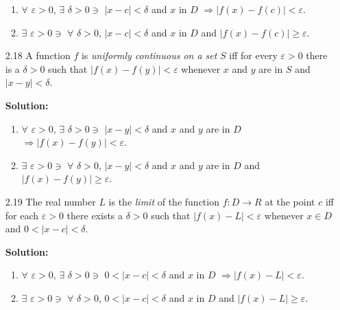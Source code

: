 \begin{enumerate}
      \begin{enumerate}
         \item $\forall$ $\varepsilon > 0$, $\exists$ $\delta > 0 \ni$
               $|x - c| < \delta$ and $x$ in $D$
               $\Rightarrow |f(x) -f(c)| < \varepsilon$.
         \item $\exists$ $\varepsilon > 0 \ni$ $\forall$ $\delta > 0$,
               $|x - c| < \delta$ and $x$ in $D$ and
               $|f(x) - f(c)| \ge \varepsilon$.
      \end{enumerate}
   \item[2.18] A function $f$ is \textit{uniformly continuous on a set} $S$ iff
               for every $\varepsilon > 0$ there is a $\delta > 0$ such that
               $|f(x) - f(y)| < \varepsilon$ whenever $x$ and $y$ are in $S$ and
               $|x - y| < \delta$.

      \textbf{Solution:}
      
      \begin{enumerate}
         \item $\forall$ $\varepsilon > 0$, $\exists$ $\delta > 0 \ni$
               $|x - y| < \delta$ and $x$ and $y$ are in $D$
               $\Rightarrow |f(x) - f(y)| < \varepsilon$.
         \item $\exists$ $\varepsilon > 0 \ni$ $\forall$ $\delta > 0$,
               $|x - y| < \delta$ and $x$ and $y$ are in $D$ and
               $|f(x) - f(y)| \ge \varepsilon$.
      \end{enumerate}
   \item[2.19] The real number $L$ is the \textit{limit} of the function
               $f : D \rightarrow R$ at the point $c$ iff for each
               $\varepsilon > 0$ there exists a $\delta > 0$ such that
               $|f(x) - L| < \varepsilon$ whenever $x \in D$ and
               $0 < |x - c| < \delta$.

      \textbf{Solution:}
      
      \begin{enumerate}
         \item $\forall$ $\varepsilon > 0$, $\exists$ $\delta > 0 \ni$
               $0 < |x - c| < \delta$ and $x$ in $D$
               $\Rightarrow |f(x) - L| < \varepsilon$.
         \item $\exists$ $\varepsilon > 0 \ni$ $\forall$ $\delta > 0$,
               $0 < |x - c| < \delta$ and $x$ in $D$ and
               $|f(x) - L| \ge \varepsilon$.
      \end{enumerate}
\end{enumerate}
